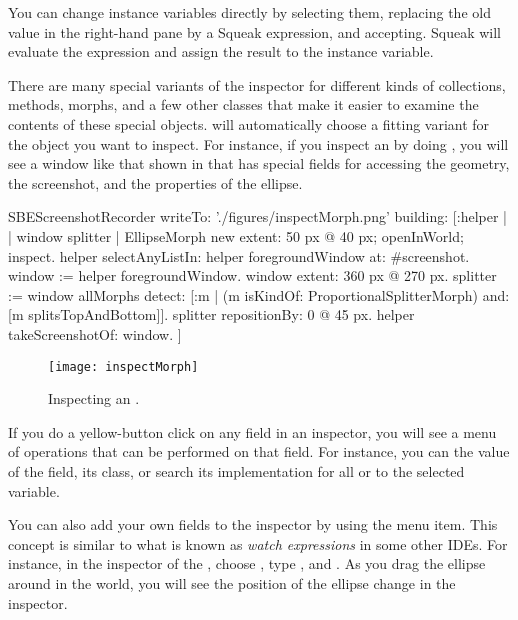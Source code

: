 \documentclass[a4paper,10pt,twoside]{book}
\begin{document}
You can change instance variables directly by selecting them, replacing the old value in the right-hand pane by a Squeak expression, and accepting.
Squeak will evaluate the expression and assign the result to the instance variable.

There are many special variants of the inspector for different kinds of collections, methods, morphs, and a few other classes that make it easier to examine the contents of these special objects.
\Squeak will automatically choose a fitting variant for the object you want to inspect.
For instance, if you inspect an  by doing , you will see a window like that shown in  that has special fields for accessing the geometry, the screenshot, and the properties of the ellipse.

\begin{ExecuteSmalltalkScript}
SBEScreenshotRecorder writeTo: './figures/inspectMorph.png' building: [:helper | | window splitter |
	EllipseMorph new extent: 50 px @ 40 px; openInWorld; inspect.
	helper selectAnyListIn: helper foregroundWindow at: #screenshot.
	window := helper foregroundWindow.
	window extent: 360 px @ 270 px.
	splitter := window allMorphs detect: [:m |
		(m isKindOf: ProportionalSplitterMorph) and: [m splitsTopAndBottom]].
	splitter repositionBy: 0 @ 45 px.
	helper takeScreenshotOf: window.
]
\end{ExecuteSmalltalkScript}

\begin{figure}[btp]
	\begin{center}
		\texttt{[image: inspectMorph]}
	\end{center}
	\caption{Inspecting an .}
	\label{fig:inspectMorph}
\end{figure}

If you do a yellow-button click on any field in an inspector, you will see a menu of operations that can be performed on that field.
For instance, you can  the value of the field,  its class, or search its implementation for all  or  to the selected variable.

You can also add your own fields to the inspector by using the  menu item.
This concept is similar to what is known as \emph{watch expressions} in some other IDEs.
For instance, in the inspector of the , choose , type , and .
As you drag the ellipse around in the world, you will see the position of the ellipse change in the inspector.
\end{document}
